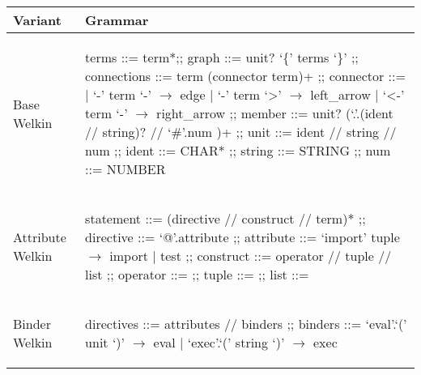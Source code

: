 \begin{center}
    \begin{tabular}{| p{1.5cm} | p{9.5cm} |}%
    \hline
    Variant & Grammar \\\hline %
      \makecell{Base \\ Welkin} &
  \begin{bnf}
  terms ::= term*;;
  graph ::= unit? `\{' terms `\}' ;;
  connections ::= term (connector term)+ ;;
	connector ::=
   | `-' term `-' $\to$ edge
   | `-' term `>' $\to$ left\_arrow
	 | `<-' term `-' $\to$ right\_arrow ;;
  member ::= unit? (`.'.(ident // string)? // `\#'.num )+ ;;
	unit ::= ident // string // num ;;
  ident ::= CHAR* ;;
	string ::= STRING ;;
	num ::= NUMBER
\end{bnf} \\ %
   \hline
      Attribute Welkin &
      \begin{bnf}
  statement ::= (directive // construct // term)* ;;
  directive ::= `@'.attribute ;;
  attribute ::= `import' tuple $\to$ import
  | test ;;
  construct ::= operator // tuple // list ;;
  operator ::= ;;
  tuple ::= ;;
  list ::=
 \end{bnf} \\
   \hline
   Binder Welkin & \begin{bnf}
     directives ::= attributes // binders ;;
     binders ::= `eval'.`(' unit `)' $\to$ eval
     | `exec'.`(' string `)' $\to$ exec
   \end{bnf} \\ %
    \hline
 \end{tabular}
\end{center}





